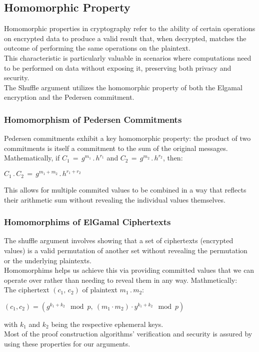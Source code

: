 \documentclass[12pt,a4paper]{report}
\begin{document}
\subsection{Homomorphic Property}
Homomorphic properties in cryptography refer to the ability of certain 
operations on encrypted data to produce a valid result that, 
when decrypted, matches the outcome of performing the same operations on the plaintext.\\
This characteristic is particularly valuable in scenarios where computations need to be performed on data without exposing it, preserving both privacy and security.\\
The Shuffle argument utilizes the homomorphic property of both the Elgamal encryption and the Pedersen commitment.
\subsubsection{Homomorphism of Pedersen Commitments}
Pedersen commitments exhibit a key homomorphic property: the product of two commitments is itself a commitment to the sum of the original messages.
Mathematically, if $C_1\,=\,g^{m_1}\,.\,h^{r_1}$ and $C_2\,=\,g^{m_2}\,.\,h^{r_2}$, then:\\ 
\begin{center}
$C_1\,.\,C_2\,=\,g^{m_1 + m_2}\,.\,h^{r_1 + r_2}$
\end{center}
This allows for multiple commited values to be combined in a way that reflects their arithmetic sum without revealing the individual values themselves.
\subsubsection{Homomorphims of ElGamal Ciphertexts}
The shuffle argument involves showing that a set of ciphertexts (encrypted values) is a valid permutation of another set without revealing the permutation or the underlying plaintexts.\\
Homomorphims helps us achieve this via providing committed values that we can operate over rather than needing to reveal them in any way. Mathmetically:\\
The ciphertext $(c_1,\,c_2)$ of plaintext $m_1\,.\,m_2$:\\
\begin{center}
$(c_1, c_2) = \left( g^{k_1 + k_2} \mod p, \ (m_1 \cdot m_2) \cdot y^{k_1 + k_2} \mod p \right)$
\end{center}
with $k_1$ and $k_2$ being the respective ephemeral keys.\\
Most of the proof construction algorithms' verification and security is assured 
by using these properties for our arguments.
\end{document}
